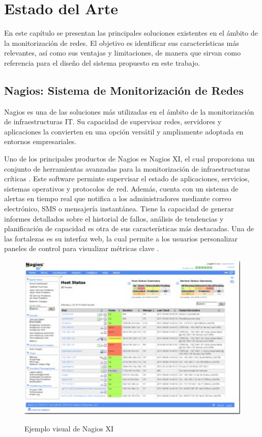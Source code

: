 
\chapter{Estado del Arte}

En este capítulo se presentan las principales soluciones existentes en el ámbito de la monitorización de redes. El objetivo es identificar sus características más relevantes, así como sus ventajas y limitaciones, de manera que sirvan como referencia para el diseño del sistema propuesto en este trabajo.

\section{Nagios: Sistema de Monitorización de Redes}
Nagios es una de las soluciones más utilizadas en el ámbito de la monitorización de infraestructuras IT. Su capacidad de supervisar redes, servidores y aplicaciones la convierten en una opción versátil y ampliamente adoptada en entornos empresariales. 

Uno de los principales productos de Nagios es Nagios XI, el cual proporciona un conjunto de herramientas avanzadas para la monitorización de infraestructuras críticas \citep{nagios2014}. Este software perminte supervisar el estado de aplicaciones, servicios, sistemas operativos y protocolos de red. Además, cuenta con un sistema de alertas en tiempo real que notifica a los administradores mediante correo electrónico, SMS o mensajería instantánea. Tiene la capacidad de generar informes detallados sobre el historial de fallos, análisis de tendencias y planificación de capacidad es otra de sus características más destacadas. Una de las fortalezas es su interfaz web, la cual permite a los usuarios personalizar paneles de control para visualizar métricas clave \citep{nagios2014}.

\begin{figure}[H]
    \centering
    {\includegraphics[width=0.7\linewidth]{imagenes/image2.png}}
    \caption{Ejemplo visual de Nagios XI \citep{nagios2014}}
    \label{fig:enter-label}
\end{figure}

